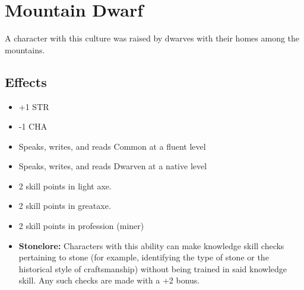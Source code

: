 \section{Mountain Dwarf}\label{culture:mountain-dwarf}
A character with this culture was raised by dwarves with their homes among the
mountains.

\subsection*{Effects}
\begin{itemize}
    \item +1 STR
    \item -1 CHA
    \item Speaks, writes, and reads Common at a fluent level
    \item Speaks, writes, and reads Dwarven at a native level
    \item 2 skill points in light axe.
    \item 2 skill points in greataxe.
    \item 2 skill points in profession (miner)
    \item \textbf{Stonelore:} Characters with this ability can make knowledge
        skill checks pertaining to stone (for example, identifying the type of
        stone or the historical style of craftsmanship) without being trained
        in said knowledge skill. Any such checks are made with a +2 bonus.
\end{itemize}
